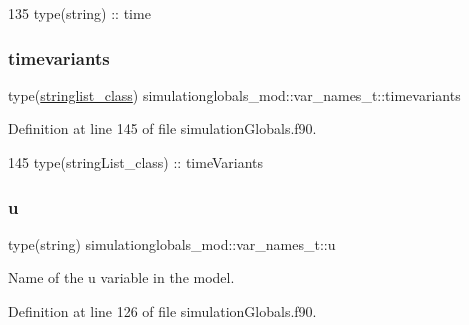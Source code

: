 \begin{DoxyCode}
135         \textcolor{keywordtype}{type}(string) :: time
\end{DoxyCode}
\mbox{\label{structsimulationglobals__mod_1_1var__names__t_a983950f023530bcc71b0a6d2d0037cbc}} 
\subsubsection{\texorpdfstring{timevariants}{timevariants}}
{\footnotesize\ttfamily type(\mbox{\hyperlink{structsimulationglobals__mod_1_1stringlist__class}{stringlist\+\_\+class}}) simulationglobals\+\_\+mod\+::var\+\_\+names\+\_\+t\+::timevariants\hspace{0.3cm}{\ttfamily [private]}}



Definition at line 145 of file simulation\+Globals.\+f90.


\begin{DoxyCode}
145         \textcolor{keywordtype}{type}(stringList\_class) :: timeVariants
\end{DoxyCode}
\mbox{\label{structsimulationglobals__mod_1_1var__names__t_a05e03dc8cb0d9e041cd0989d4bb283f6}} 
\subsubsection{\texorpdfstring{u}{u}}
{\footnotesize\ttfamily type(string) simulationglobals\+\_\+mod\+::var\+\_\+names\+\_\+t\+::u\hspace{0.3cm}{\ttfamily [private]}}



Name of the \textquotesingle{}u\textquotesingle{} variable in the model. 



Definition at line 126 of file simulation\+Globals.\+f90.


